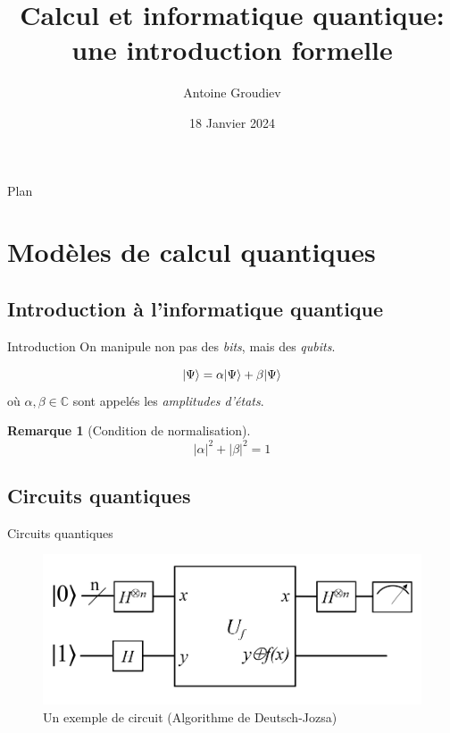 \documentclass[aspectratio=169]{beamer}
\title{\textbf{Calcul et informatique quantique:\\une introduction formelle}}
\author{Antoine Groudiev}
\institute{ENS Ulm}
\date{18 Janvier 2024}
\theoremstyle{plain}
\newtheorem*{remark}{Remarque}
\theoremstyle{definition}
\DeclarePairedDelimiter\ket{\lvert}{\rangle}
\begin{document}
\frame{\titlepage}

\begin{frame}{Plan}
    \tableofcontents
\end{frame}

\section{Modèles de calcul quantiques}

\subsection{Introduction à l'informatique quantique}
\begin{frame}{Introduction}
    On manipule non pas des \emph{bits}, mais des \emph{qubits}.
    \begin{definition}        
        \begin{equation*}
            \ket{\Psi}=\alpha\ket{\Psi}+\beta\ket{\Psi}
        \end{equation*}
        où $\alpha, \beta\in \mathbb{C}$ sont appelés les \emph{amplitudes d'états}. 
    \end{definition}

    \begin{remark}[Condition de normalisation]
        \begin{equation*}
        |\alpha|^2+|\beta|^2=1
        \end{equation*}
    \end{remark}
\end{frame}

\subsection{Circuits quantiques}
\begin{frame}{Circuits quantiques}
    \begin{figure}[!ht]
        \centering
        \includegraphics[scale=0.5]{deutsch-circuit-n.png}
        \caption{Un exemple de circuit (Algorithme de Deutsch-Jozsa)}
    \end{figure}
\end{frame}
\end{document}
